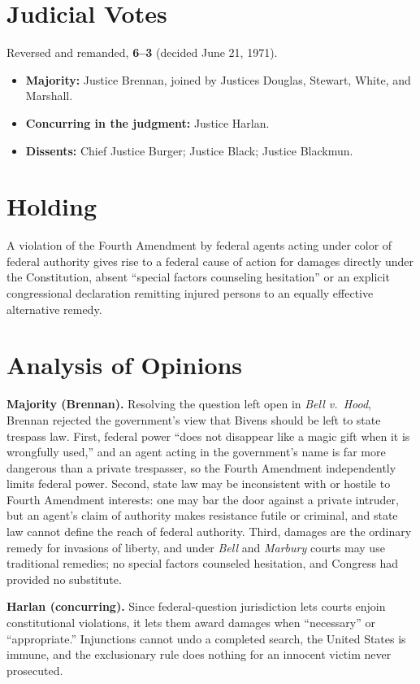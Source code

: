 \documentclass[12pt]{article}
\begin{document}
\section{Judicial Votes}

Reversed and remanded, \textbf{6--3} (decided June 21, 1971).
\begin{itemize}
\item \textbf{Majority:} Justice Brennan, joined by Justices Douglas, Stewart, White, and Marshall.
\item \textbf{Concurring in the judgment:} Justice Harlan.
\item \textbf{Dissents:} Chief Justice Burger; Justice Black; Justice Blackmun.
\end{itemize}

\section{Holding}

A violation of the Fourth Amendment by federal agents acting under color of federal authority gives rise to a federal cause of action for damages directly under the Constitution, absent ``special factors counseling hesitation'' or an explicit congressional declaration remitting injured persons to an equally effective alternative remedy.

\section{Analysis of Opinions}

\textbf{Majority (Brennan).} Resolving the question left open in \textit{Bell v.\ Hood}, Brennan rejected the government's view that Bivens should be left to state trespass law. First, federal power ``does not disappear like a magic gift when it is wrongfully used,'' and an agent acting in the government's name is far more dangerous than a private trespasser, so the Fourth Amendment independently limits federal power. Second, state law may be inconsistent with or hostile to Fourth Amendment interests: one may bar the door against a private intruder, but an agent's claim of authority makes resistance futile or criminal, and state law cannot define the reach of federal authority. Third, damages are the ordinary remedy for invasions of liberty, and under \textit{Bell} and \textit{Marbury} courts may use traditional remedies; no special factors counseled hesitation, and Congress had provided no substitute.

\textbf{Harlan (concurring).} Since federal-question jurisdiction lets courts enjoin constitutional violations, it lets them award damages when ``necessary'' or ``appropriate.'' Injunctions cannot undo a completed search, the United States is immune, and the exclusionary rule does nothing for an innocent victim never prosecuted.
\end{document}
